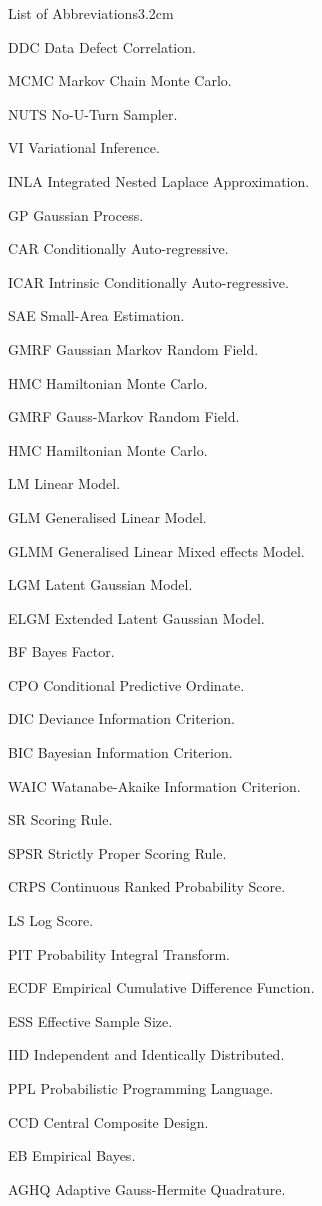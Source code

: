 \begin{mclistof}{List of Abbreviations}{3.2cm}
\item[DDC] Data Defect Correlation.
\item[MCMC] Markov Chain Monte Carlo.
\item[NUTS] No-U-Turn Sampler.
\item[VI] Variational Inference.
\item[INLA] Integrated Nested Laplace Approximation.
\item[GP] Gaussian Process.
\item[CAR] Conditionally Auto-regressive.
\item[ICAR] Intrinsic Conditionally Auto-regressive.
\item[SAE] Small-Area Estimation.
\item[GMRF] Gaussian Markov Random Field.
\item[HMC] Hamiltonian Monte Carlo.
\item[GMRF] Gauss-Markov Random Field.
\item[HMC] Hamiltonian Monte Carlo.
\item[LM] Linear Model.
\item[GLM] Generalised Linear Model.
\item[GLMM] Generalised Linear Mixed effects Model.
\item[LGM] Latent Gaussian Model.
\item[ELGM] Extended Latent Gaussian Model.
\item[BF] Bayes Factor.
\item[CPO] Conditional Predictive Ordinate.
\item[DIC] Deviance Information Criterion.
\item[BIC] Bayesian Information Criterion.
\item[WAIC] Watanabe-Akaike Information Criterion.
\item[SR] Scoring Rule.
\item[SPSR] Strictly Proper Scoring Rule.
\item[CRPS] Continuous Ranked Probability Score.
\item[LS] Log Score.
\item[PIT] Probability Integral Transform.
\item[ECDF] Empirical Cumulative Difference Function.
\item[ESS] Effective Sample Size.
\item[IID] Independent and Identically Distributed.
\item[PPL] Probabilistic Programming Language.
\item[CCD] Central Composite Design.
\item[EB] Empirical Bayes.
\item[AGHQ] Adaptive Gauss-Hermite Quadrature.

\end{mclistof} 
